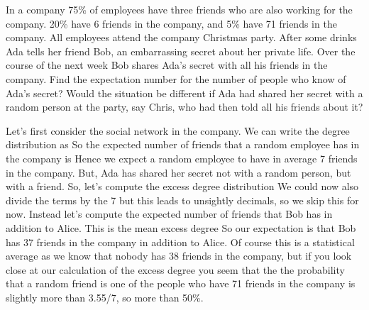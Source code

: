 
In a company 75\% of employees have three friends who are also working for the company. 20\% have 6 friends in the company, and 5\% have 71 friends in the company. All employees attend the company Christmas party. After some drinks Ada tells her friend Bob, an embarrassing secret about her private life. Over the course of the next week Bob shares Ada's secret with all his friends in the company. Find the expectation number for the number of people who know of Ada's secret?
Would the situation be different if Ada had shared her secret with a random person at the party, say Chris, who had then told all his friends about it?   

\solution
Let's first consider the social network in the company. We can write the degree distribution as  
So the expected number of friends that a random employee has in the company is 
Hence we expect a random employee to have in average 7 friends in the company. 
But, Ada has shared her secret not with a random person, but with a friend. So, let's compute the excess degree distribution 
We could now also divide the terms by the 7 but this leads to unsightly decimals, so we skip this for now. Instead let's compute the expected number of friends that Bob has in addition to Alice. This is the mean excess degree 
So our expectation is that Bob has 37 friends in the company in addition to Alice. Of course this is a statistical average as we know that nobody has 38 friends in the company, but if you look close at our calculation of the excess degree you seem that the the probability that a random friend is one of the people who have 71 friends in the company is slightly more than 3.55/7, so more than 50\%. 

